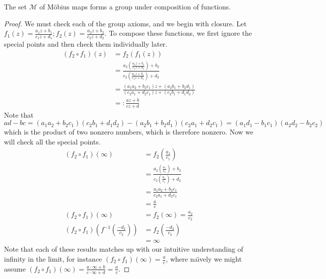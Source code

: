 \begin{theorem}
	The set \(\mathcal M\) of M\"obius maps forms a group under composition of functions.
\end{theorem}
\begin{proof}
	We must check each of the group axioms, and we begin with closure.
	Let \(f_1(z) = \frac{a_1 z + b_1}{c_1 z + d_1}; f_2(z) = \frac{a_2 z + b_2}{c_2 z + d_2}\).
	To compose these functions, we first ignore the special points and then check them individually later.
	\begin{align*}
		(f_2 \circ f_1)(z) & = f_2(f_1(z))                                                                                                               \\
		                   & = \frac{a_2 \left( \frac{a_1 z + b_1}{c_1 z + d_1} \right) + b_2}{c_2 \left( \frac{a_1 z + b_1}{c_1 z + d_1} \right) + d_2} \\
		                   & = \frac{(a_1 a_2 + b_2 c_1)z + (a_2 b_1 + b_2 d_1)}{(c_2 a_1 + d_2 c_1)z + (c_2 b_1 + d_1 d_2)}                             \\
		                   & =: \frac{az + b}{cz + d}
	\end{align*}
	Note that \(ad-bc = (a_1 a_2 + b_2 c_1)(c_2 b_1 + d_1 d_2) - (a_2 b_1 + b_2 d_1)(c_2 a_1 + d_2 c_1) = (a_1 d_1 - b_1 c_1)(a_2 d_2 - b_2 c_2)\) which is the product of two nonzero numbers, which is therefore nonzero.
	Now we will check all the special points.
	\begin{align*}
		(f_2 \circ f_1)(\infty)                                         & = f_2\left(\frac{a_1}{c_1}\right)                                                           \\
		                                                                & = \frac{a_2 \left( \frac{a_1}{c_1} \right) + b_2}{c_2 \left( \frac{a_1}{c_1} \right) + d_2} \\
		                                                                & = \frac{a_1 a_2 + b_2 c_1}{c_2 a_1 + d_2 c_1}                                               \\
		                                                                & = \frac{a}{c}                                                                               \\
		(f_2 \circ f_1)(\infty)                                         & = f_2(\infty) = \frac{a_2}{c_2}                                                             \\
		(f_2 \circ f_1)\left(f^{-1}\left(\frac{-d_2}{c_2}\right)\right) & = f_2\left( \frac{-d_2}{c_2} \right)                                                        \\
		                                                                & = \infty
	\end{align*}
	Note that each of these results matches up with our intuitive understanding of infinity in the limit, for instance \((f_2 \circ f_1)(\infty) = \frac{a}{c}\), where na\"\i{}vely we might assume \((f_2 \circ f_1)(\infty) = \frac{a \cdot \infty + b}{c \cdot \infty + d} = \frac{a}{c}\).


\end{proof}
